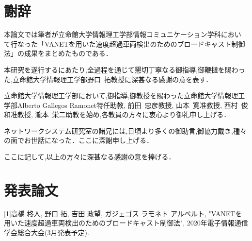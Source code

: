 \documentclass[10pt]{jreport}
\begin{document}

\chapter*{謝辞}
\sloppy
本論文では筆者が立命館大学情報理工学部情報コミュニケーション学科におい
て行なった「VANETを用いた速度超過車両検出のためのブロードキャスト制御法」の成果をまとめたものである．

本研究を遂行するにあたり,全過程を通じて懇切丁寧なる御指導,御鞭撻を賜わっ
た,立命館大学情報理工学部野口~拓教授に深甚なる感謝の意を表す．

立命館大学情報理工学部において,御指導,御教授を賜わった立命館大学情報理工学部Alberto Gallegos Ramonet特任助教, 前田~忠彦教授, 山本~寛准教授, 西村~俊和准教授, 瀧本~栄二助教を始め,各教員の方々に衷心より御礼申し上げる．


ネットワークシステム研究室の諸兄には,日頃より多くの御助言,御協力戴き,種々の面でお世話になった．ここに深謝申し上げる．

ここに記して,以上の方々に深甚なる感謝の意を捧げる．









\chapter*{発表論文}
\small
[1]高橋 柊人, 野口 拓, 吉田 政望, ガジェゴス ラモネト アルベルト, "VANETを用いた速度超過車両検出のためのブロードキャスト制御法", 2020年電子情報通信学会総合大会(3月発表予定).
\end{document}
